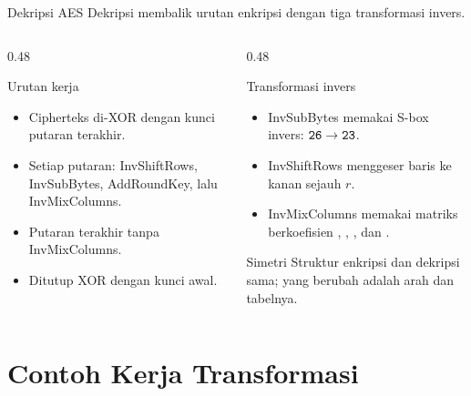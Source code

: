 \documentclass[aspectratio=169,11pt]{beamer}
\begin{document}
\begin{frame}{Dekripsi AES}
    \footnotesize
    Dekripsi membalik urutan enkripsi dengan tiga transformasi invers.
    \vspace{0.1cm}
    \begin{columns}[T,onlytextwidth]
        \begin{column}{0.48\textwidth}
            \begin{block}{Urutan kerja}
                \begin{itemize}
                    \item Cipherteks di-XOR dengan kunci putaran terakhir.
                    \item Setiap putaran: InvShiftRows, InvSubBytes,
                          AddRoundKey, lalu InvMixColumns.
                    \item Putaran terakhir tanpa InvMixColumns.
                    \item Ditutup XOR dengan kunci awal.
                \end{itemize}
            \end{block}
        \end{column}
        \begin{column}{0.48\textwidth}
            \begin{exampleblock}{Transformasi invers}
                \begin{itemize}
                    \item InvSubBytes memakai S-box invers:
                          $\texttt{26} \to \texttt{23}$.
                    \item InvShiftRows menggeser baris ke kanan sejauh $r$.
                    \item InvMixColumns memakai matriks berkoefisien
                          , , , dan .
                \end{itemize}
            \end{exampleblock}
            \begin{alertblock}{Simetri}
                Struktur enkripsi dan dekripsi sama; yang berubah adalah
                arah dan tabelnya.
            \end{alertblock}
        \end{column}
    \end{columns}
\end{frame}

\section{Contoh Kerja Transformasi}
\end{document}
